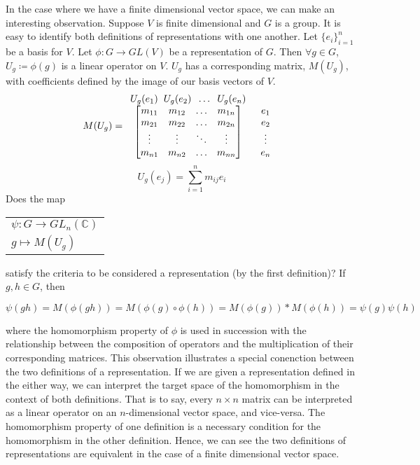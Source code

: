 \begin{remark}
	In the case where we have a finite dimensional vector space, we can make an interesting observation. Suppose $V$ is finite dimensional and $G$ is a group. It is easy to identify both definitions of representations with one another. Let $\{e_i\}_{i=1}^n$ be a basis for $V$. Let $\phi : G \rightarrow GL(V)$ be a representation of $G$. Then $\forall g \in G$, $U_g\coloneq\phi(g)$ is a linear operator on $V$. $U_g$ has a corresponding matrix, $M(U_g)$, with coefficients defined by the image of our basis vectors of $V$.
$$M(U_g) = \begin{array}{c c}
			U_g(e_1) \hspace{2mm} U_g(e_2) \hspace{2mm} \hdots \hspace{2mm}  U_g(e_n) & \\
			\begin{bmatrix}
				m_{11} & m_{12} & \hdots & m_{1n}\\
				m_{21} & m_{22} & \hdots & m_{2n} \\
				\vdots & \vdots & \ddots & \vdots\\
				m_{n1} & m_{n2} & \hdots & m_{nn}\\
			\end{bmatrix}
			&
			\begin{array}{c}
				e_1\\
				e_2\\
				\vdots\\
				e_n\\
			\end{array}
		\end{array}$$
$$U_g(e_j) = \sum_{i=1}^n m_{ij}e_i$$
\renewcommand{\arraystretch}{0.5}
Does the map \begin{tabular}{l}
			$\psi:G\rightarrow GL_n(\mathbb{C})$\\
			\hspace{6mm}$g\mapsto M(U_g)$
       		 \end{tabular}
satisfy the criteria to be considered a representation (by the first definition)? If $g,h \in G$, then

	$$\psi(gh) = M(\phi(gh)) = M(\phi(g)\circ \phi(h)) = M(\phi(g))*M(\phi(h)) = \psi(g)\psi(h)$$

\noindent where the homomorphism property of $\phi$ is used in succession with the relationship between the composition of operators and the multiplication of their corresponding matrices. This observation illustrates a special conenction between the two definitions of a representation. If we are given a representation defined in the either way, we can interpret the target space of the homomorphism in the context of both definitions. That is to say, every $n\times n$ matrix can be interpreted as a linear operator on an $n$-dimensional vector space, and vice-versa. The homomorphism property of one definition is a necessary condition for the homomorphism in the other definition. Hence, we can see the two definitions of representations are equivalent in the case of a finite dimensional vector space.
\end{remark}

